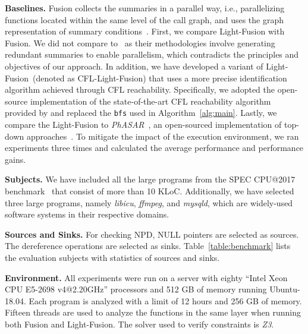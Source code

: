 \textbf{Baselines.}
Fusion collects the summaries in a parallel way, i.e., parallelizing functions located within the same level of the call graph, and uses the graph representation of summary conditions~\cite{shi2021path}.
First, we compare Light-Fusion with Fusion. 
We did not compare to~\cite{shi2020pipelining}\cite{tang2023Scaling} as their methodologies involve generating redundant summaries to enable parallelism, which contradicts the principles and objectives of our approach.
In addition, we have developed a variant of Light-Fusion~(denoted as CFL-Light-Fusion) that uses a more precise identification algorithm achieved through CFL reachability.
Specifically, we adopted the open-source implementation of the state-of-the-art CFL reachability algorithm~\cite{lei2022taming} provided by \cite{pocr} and replaced the \texttt{bfs} used in Algorithm~\ref{alg:main}.
Lastly, we compare the Light-Fusion to \textit{PhASAR}~\cite{10.1007/978-3-030-17465-1_22}, an open-sourced implementation of top-down approaches~\cite{reps1995precise, reps1994speeding, murphy1999program, sagiv1996precise}. 
To mitigate the impact of the execution environment, we ran experiments three times and calculated the average performance and performance gains.


\textbf{Subjects.}
We have included all the large programs from the SPEC CPU@2017 benchmark~\cite{bucek2018spec} that consist of more than 10 KLoC. 
Additionally, we have selected three large programs, namely \textit{libicu}, \textit{ffmpeg}, and \textit{mysqld}, which are widely-used software systems in their respective domains.

\textbf{Sources and Sinks.}
For checking NPD, 
NULL pointers are selected as sources.
The dereference operations are selected as sinks.
Table~\ref{table:benchmark} lists the evaluation subjects with statistics of sources and sinks. 

\textbf{Environment.}
All experiments were run on a server with eighty “Intel Xeon CPU E5-2698 v4@2.20GHz” processors and 512 GB of memory running Ubuntu-18.04.
Each program is analyzed with a limit of 12 hours and 256 GB of memory.
Fifteen threads are used to analyze the functions in the same layer when running both Fusion and Light-Fusion.
The solver used to verify constraints is \textit{Z3}\cite{de2008z3}.

